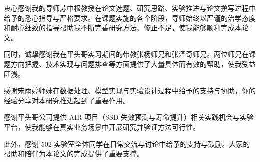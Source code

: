 \cleardoublepage
{}

衷心感谢我的导师苏中根教授在论文选题、研究思路、实验推进与论文撰写过程中给予的悉心指导与严格要求。在课题实施的各个阶段，导师始终以严谨的治学态度和耐心细致的指导帮助我不断完善研究方法、修正不足，使我能够顺利完成本论文。

同时，诚挚感谢我在平头哥实习期间的带教张杨师兄和张泽奇师兄。两位师兄在课题方向把握、技术实现与问题排查等方面提供了大量具体而有效的帮助，使我受益匪浅。

感谢宋雨婷师妹在数据处理、模型实现与实验设计过程中给予的支持与协助，你的经验分享对本研究推进起到了重要作用。

感谢平头哥公司提供 AIR 项目（SSD 失效预测与寿命提升）相关实践机会与实验平台，使我能够在真实业务场景中开展研究并验证方法可行性。

此外，感谢 502 实验室全体同学在日常交流与讨论中给予的支持与鼓励。大家的帮助和陪伴为本论文的完成提供了重要支撑。
